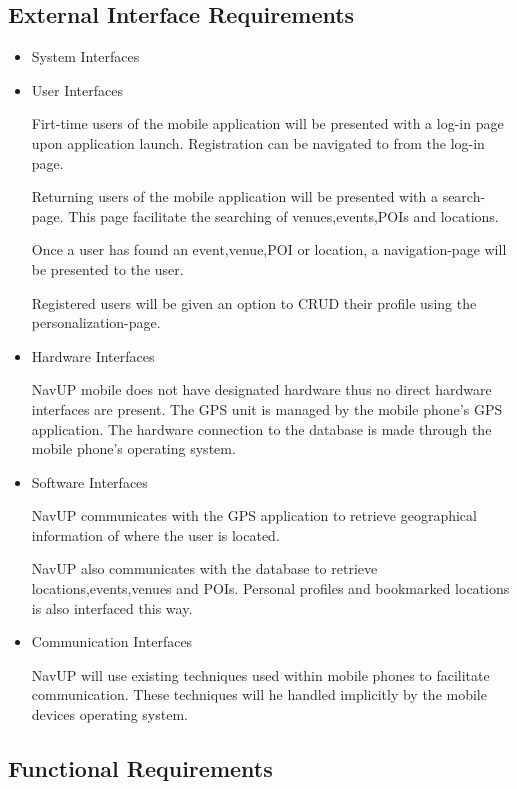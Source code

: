 \documentclass{article}
\begin{document}
    \subsection{External Interface Requirements}
		\begin{itemize}
		
			\item System Interfaces
			\item User Interfaces
			
			Firt-time users of the mobile application will be presented with a log-in page upon application launch. Registration can be navigated to from the log-in page.
			
			Returning users of the mobile application will be presented with a search-page. This page facilitate the searching of venues,events,POIs and locations.
			
			Once a user has found an event,venue,POI or location, a navigation-page will be presented to the user.
			
			Registered users will be given an option to CRUD their profile using the personalization-page.
			
			
			\item Hardware Interfaces
			
			NavUP mobile does not have designated hardware thus no direct hardware interfaces are present. The GPS unit is managed by the mobile phone's GPS application. The hardware connection to the database is made through the mobile phone's operating system.
			
			\item Software Interfaces
			
			NavUP communicates with the GPS application to retrieve geographical information of where the user is located.
			
			NavUP also communicates with the database to retrieve locations,events,venues and POIs. Personal profiles and bookmarked locations is also interfaced this way.
			
			
			\item Communication Interfaces
			
			NavUP will use existing techniques used within mobile phones to facilitate communication. These techniques will he handled implicitly by the mobile devices operating system.
			
		\end{itemize}
    \subsection{Functional Requirements}
    	
\end{document}
